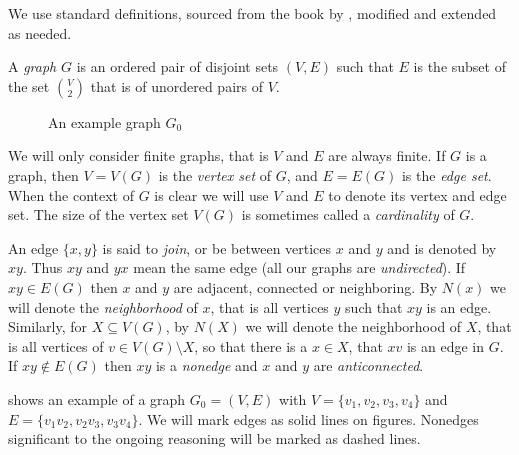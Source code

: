 
We use standard definitions, sourced from the book by \citeauthor{BB98} , modified and extended as needed.

\begin{defn}[graph]
  A \emph{graph} $G$ is an ordered pair of disjoint sets $(V, E)$ such that $E$ is the subset of the set $V \choose 2$ that is of unordered pairs of $V$.
\end{defn}

\begin{wrapfigure}{r}{0.4\textwidth}
  \centering{}
  \caption{An example graph $G_0$}
  \label{fig:examplePath}
\end{wrapfigure}

We will only consider finite graphs, that is $V$ and $E$ are always finite. If $G$ is a graph, then $V = V(G)$ is the \emph{vertex set} of $G$, and $E = E(G)$ is the \emph{edge set}. When the context of $G$ is clear we will use $V$ and $E$ to denote its vertex and edge set. The size of the vertex set $V(G)$ is sometimes called a \emph{cardinality} of $G$.

An edge $\{x, y\}$ is said to \emph{join}, or be between vertices $x$ and $y$ and is denoted by $xy$. Thus $xy$ and $yx$ mean the same edge (all our graphs are \emph{undirected}). If $xy \in E(G)$ then $x$ and $y$ are adjacent, connected or neighboring. By $N(x)$ we will denote the \emph{neighborhood} of $x$, that is all vertices $y$ such that $xy$ is an edge. Similarly, for $X \subseteq V(G)$, by $N(X)$ we will denote the neighborhood of $X$, that is all vertices of $v \in V(G) \setminus X$, so that there is a $x \in X$, that $xv$ is an edge in $G$. If $xy \notin E(G)$ then $xy$ is a \emph{nonedge} and $x$ and $y$ are \emph{anticonnected}.

 shows an example of a graph $G_0 = (V, E)$ with $V = \{v_1, v_2, v_3, v_4\}$ and $E = \{v_1v_2, v_2v_3, v_3v_4\}$. We will mark edges as solid lines on figures. Nonedges significant to the ongoing reasoning will be marked as dashed lines.

